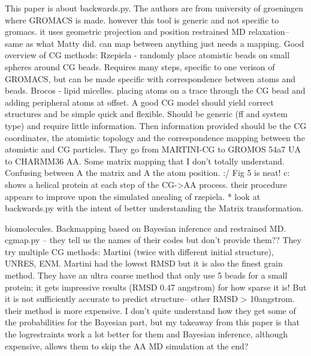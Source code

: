 \documentclass{article}
\begin{document}
\cite{Wassenar2014b}

This paper is about backwards.py. The authors are from university of groeningen where GROMACS is made. however this tool is generic and not specific to gromacs. it uses geometric projection and position restrained MD relaxation--same as what Matty did. can map between anything just needs a mapping.
Good overview of CG methods:
Rzepiela - randomly place atomistic beads on small spheres around CG beads. Requires many steps, specific to one verison of GROMACS, but can be made specific with correspondence between atoms and beads.
Brocos - lipid micelles. placing atoms on a trace through the CG bead and adding peripheral atoms at offset. 
A good CG model should yield correct structures and be simple quick and flexible. Should be generic (ff and system type) and require little information. Then information provided should be the CG coordinates, the atomistic topology and the correspondence mapping between the atomistic and CG particles.
They go from MARTINI-CG to GROMOS 54a7 UA to CHARMM36 AA.
Some matrix mapping that I don't totally understand. Confusing between A the matrix and A the atom position. :/
Fig 5 is neat! c: shows a helical protein at each step of the CG->AA process. their procedure appears to improve upon the simulated anealing of rzepiela. 
* look at backwards.py with the intent of better understanding the Matrix transformation.

\cite{Peng2019a}

biomolecules. Backmapping based on Bayesian inference and restrained MD. cgmap.py -- they tell us the names of their codes but don't provide them?? They try multiple CG methods: Martini (twice with different initial structure), UNRES, ENM. Martini had the lowest RMSD but it is also the finest grain method. They have an ultra coarse method that only use 5 beads for a small protein; it gets impressive results (RMSD 0.47 angstrom) for how sparse it is! But it is not sufficiently accurate to predict structure-- other RMSD > 10angstrom. their method is more expensive. I don't quite understand how they get some of the probabilities for the Bayesian part, but my takeaway from this paper is that the logrestraints work a lot better for them and Bayesian inference, although expensive, allows them to skip the AA MD simulation at the end?

\cite{Rolland2020a}
\end{document}
